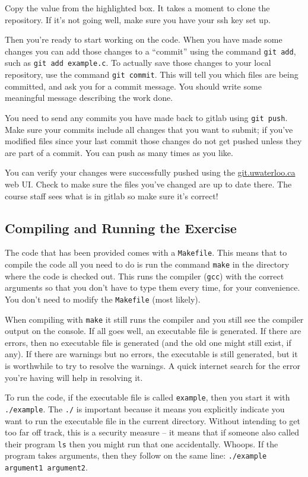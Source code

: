 Copy the value from the highlighted box. It takes a moment to clone the repository. If it's not going well, make sure you have your ssh key set up. 

Then you're ready to start working on the code. When you have made some changes you can add those changes to a ``commit'' using the command \texttt{git add}, such as \texttt{git add example.c}. To actually save those changes to your local repository, use the command \texttt{git commit}. This will tell you which files are being committed, and ask you for a commit message. You should write some meaningful message describing the work done.

You need to send any commits you have made back to gitlab using \texttt{git push}. Make sure your commits include all changes that you want to submit; if you've modified files since your last commit those changes do not get pushed unless they are part of a commit. You can push as many times as you like.

You can verify your changes were successfully pushed using the \url{git.uwaterloo.ca} web UI. Check to make sure the files you've changed are up to date there. The course staff sees what is in gitlab so make sure it's correct!

\subsection*{Compiling and Running the Exercise}

The code that has been provided comes with a \texttt{Makefile}. This means that to compile the code all you need to do is run the command \texttt{make} in the directory where the code is checked out. This runs the compiler (\texttt{gcc}) with the correct arguments so that you don't have to type them every time, for your convenience. You don't need to modify the \texttt{Makefile} (most likely). 

When compiling with \texttt{make} it still runs the compiler and you still see the compiler output on the console. If all goes well, an executable file is generated. If there are errors, then no executable file is generated (and the old one might still exist, if any). If there are warnings but no errors, the executable is still generated, but it is worthwhile to try to resolve the warnings. A quick internet search for the error you're having will help in resolving it. 

To run the code, if the executable file is called \texttt{example}, then you start it with \texttt{./example}. The \texttt{./} is important because it means you explicitly indicate you want to run the executable file in the current directory. Without intending to get too far off track, this is a security measure -- it means that if someone also called their program  \texttt{ls} then you might run that one accidentally. Whoops. If the program takes arguments, then they follow on the same line: \texttt{./example argument1 argument2}.




